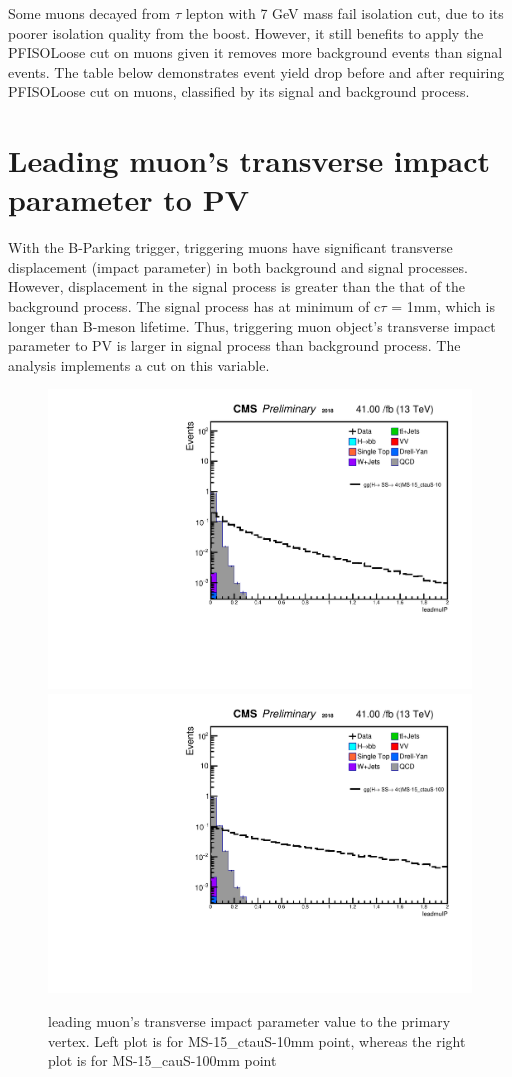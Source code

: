 Some muons decayed from $\tau$ lepton with 7 GeV mass fail isolation cut, due to its poorer isolation quality from the boost.
However, it still benefits to apply the PFISOLoose cut on muons given it removes more background events than signal events.
The table below demonstrates event yield drop before and after requiring PFISOLoose cut on muons, classified by its signal and background process. 


\section{Leading muon's transverse impact parameter to PV}\label{ref:muIP}
With the B-Parking trigger, triggering muons have significant transverse displacement (impact parameter) in both background and signal processes.
However, displacement in the signal process is greater than the that of the background process.
The signal process has at minimum of c$\tau$ = 1mm, which is longer than B-meson lifetime.
Thus, triggering muon object's transverse impact parameter to PV is larger in signal process than background process.
The analysis implements a cut on this variable.


 \begin{figure}[h!]
   \caption{leading muon's transverse impact parameter value to the primary vertex. Left plot is for MS-15\_ctauS-10mm point, whereas the right plot is for MS-15\_cauS-100mm point}
   \label{fig:leadmuIP}
   \centering
   \includegraphics[width=0.47\linewidth]{figs/AnalysisNoteplot_MS-15_ctauS-10_leadmuIP.pdf}
   \includegraphics[width=0.47\linewidth]{figs/AnalysisNoteplot_MS-15_ctauS-100_leadmuIP.pdf}
 \end{figure}


